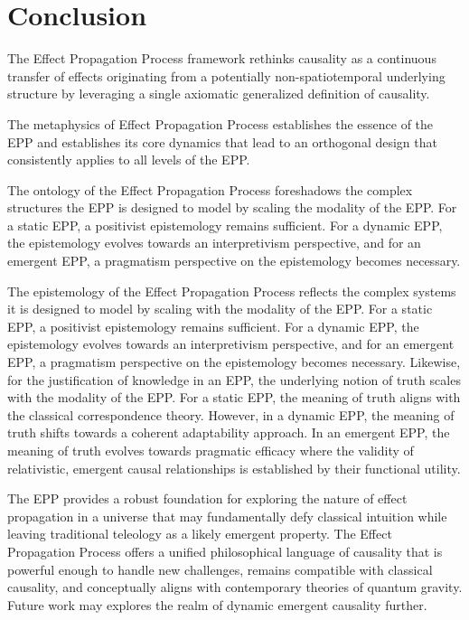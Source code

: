 \section{Conclusion}
\label{sec:conclusion}

The Effect Propagation Process framework rethinks causality as a continuous transfer of effects originating from a potentially non-spatiotemporal underlying structure by leveraging a single axiomatic generalized definition of causality.

The metaphysics of Effect Propagation Process establishes the essence of the EPP and establishes its core dynamics that lead to an orthogonal design that consistently applies to all levels of the EPP. 

The ontology of the Effect Propagation Process foreshadows the complex structures the EPP is designed to model by scaling the modality of the EPP. For a static EPP, a positivist epistemology remains sufficient. For a dynamic EPP, the epistemology evolves towards an interpretivism perspective, and for an emergent EPP, a pragmatism perspective on the epistemology becomes necessary.

The epistemology of the Effect Propagation Process reflects the complex systems it is designed to model by scaling with the modality of the EPP. For a static EPP, a positivist epistemology remains sufficient. For a dynamic EPP, the epistemology evolves towards an interpretivism perspective, and for an emergent EPP, a pragmatism perspective on the epistemology becomes necessary. Likewise, for the justification of knowledge in an EPP, the underlying notion of truth scales with the modality of the EPP. For a static EPP, the meaning of truth aligns with the classical correspondence theory. However, in a dynamic EPP, the meaning of truth shifts towards a coherent adaptability approach. In an emergent EPP, the meaning of truth evolves towards pragmatic efficacy where the validity of relativistic, emergent causal relationships is established by their functional utility.

The EPP provides a robust foundation for exploring the nature of effect propagation in a universe that may fundamentally defy classical intuition while leaving traditional teleology as a likely emergent property. The Effect Propagation Process offers a unified philosophical language of causality that is powerful enough to handle new challenges, remains compatible with classical causality, and conceptually aligns with contemporary theories of quantum gravity. Future work may explores the realm of dynamic emergent causality further. 


\newpage